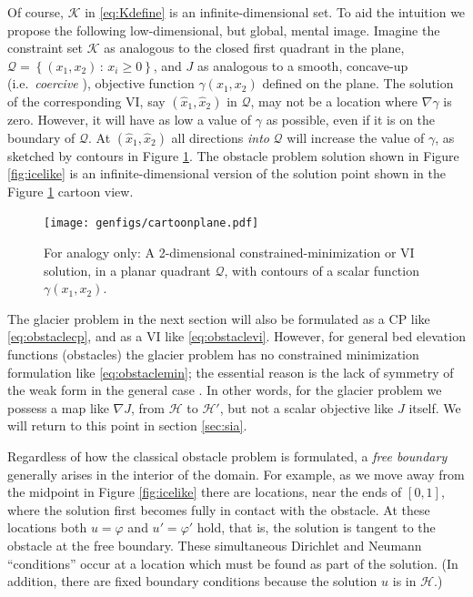 \documentclass[letterpaper,final,12pt,reqno]{amsart}
\newcommand{\grad}{\nabla}
\numberwithin{equation}{section}
\numberwithin{figure}{section}
\numberwithin{table}{section}
\begin{document}
Of course, $\mathcal{K}$ in \eqref{eq:Kdefine} is an infinite-dimensional set.  To aid the intuition we propose the following low-dimensional, but global, mental image.  Imagine the constraint set $\mathcal{K}$ as analogous to the closed first quadrant in the plane, $\mathcal{Q} = \left\{(x_1,x_2)\,:\,x_i\ge 0\right\}$, and $J$ as analogous to a smooth, concave-up (i.e.~\emph{coercive} \cite{Evans2010}), objective function $\gamma(x_1,x_2)$ defined on the plane.  The solution of the corresponding VI, say $(\hat x_1,\hat x_2)$ in $\mathcal{Q}$, may not be a location where $\nabla \gamma$ is zero.  However, it will have as low a value of $\gamma$ as possible, even if it is on the boundary of $\mathcal{Q}$.  At $(\hat x_1,\hat x_2)$ all directions \emph{into} $\mathcal{Q}$ will increase the value of $\gamma$, as sketched by contours in Figure \ref{fig:cartoonplane}.  The obstacle problem solution shown in Figure \ref{fig:icelike} is an infinite-dimensional version of the solution point shown in the Figure \ref{fig:cartoonplane} cartoon view.

\begin{figure}
\texttt{[image: genfigs/cartoonplane.pdf]}
\caption{For analogy only:  A 2-dimensional constrained-minimization or VI solution, in a planar quadrant $\mathcal{Q}$, with contours of a scalar function $\gamma(x_1,x_2)$.}
\label{fig:cartoonplane}
\end{figure}

The glacier problem in the next section will also be formulated as a CP like \eqref{eq:obstaclecp}, and as a VI like \eqref{eq:obstaclevi}.  However, for general bed elevation functions (obstacles) the glacier problem has no constrained minimization formulation like \eqref{eq:obstaclemin}; the essential reason is the lack of symmetry of the weak form in the general case \cite{JouvetBueler2012}.  In other words, for the glacier problem we possess a map like $\grad J$, from $\mathcal{H}$ to $\mathcal{H}'$, but not a scalar objective like $J$ itself.  We will return to this point in section \ref{sec:sia}.

Regardless of how the classical obstacle problem is formulated, a \emph{free boundary} generally arises in the interior of the domain.  For example, as we move away from the midpoint in Figure \ref{fig:icelike} there are locations, near the ends of $[0,1]$, where the solution first becomes fully in contact with the obstacle.  At these locations both $u=\varphi$ and $u'=\varphi'$ hold, that is, the solution is tangent to the obstacle at the free boundary.  These simultaneous Dirichlet and Neumann ``conditions'' occur at a location which must be found as part of the solution.  (In addition, there are fixed boundary conditions because the solution $u$ is in $\mathcal{H}$.)
\end{document}
